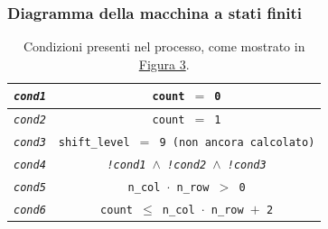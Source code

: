 \documentclass{article}
\begin{document}
\subsubsection{Diagramma della macchina a stati finiti}
\begin{table}[h]
    \centering
    \caption{Condizioni presenti nel processo, come mostrato in \hyperref[fig:fsm]{Figura 3}.}
    \begin{tabular}{||c|c||}
        \hline
        \texttt{\emph{cond1}} & \texttt{count $=$ 0} \\
        \hline
        \texttt{\emph{cond2}} & \texttt{count $=$ 1} \\
        \hline
        \texttt{\emph{cond3}} & \texttt{shift\_level $=$ 9 (non ancora calcolato)} \\
        \hline
        \texttt{\emph{cond4}} & \texttt{\emph{!cond1} $\wedge$ \emph{!cond2} $\wedge$ \emph{!cond3}} \\   
        \hline
        \texttt{\emph{cond5}} & \texttt{n\_col $\cdot$ n\_row $>$ 0} \\
        \hline
        \texttt{\emph{cond6}} & \texttt{count $\leq$ n\_col $\cdot$ n\_row $+$ 2} \\      
        \hline
        \end{tabular}
\end{table}
\pagebreak
\end{document}
